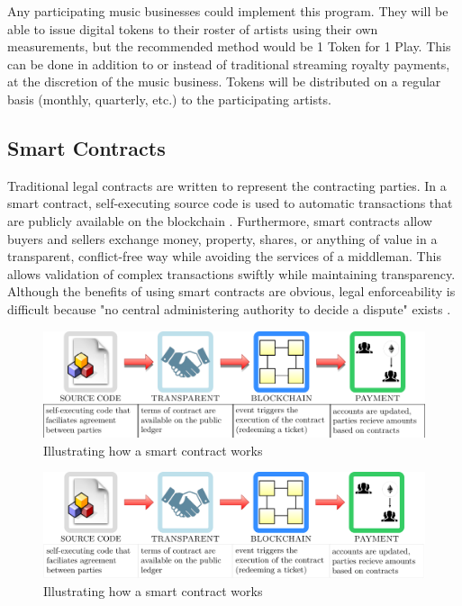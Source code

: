 \documentclass[12pt,tightenlines,letterpaper]{scrartcl}
\begin{document}
Any participating music businesses could implement this program. They will be able to issue digital tokens to their roster of artists using their own measurements, but the recommended method would be 1 Token for 1 Play. This can be done in addition to or instead of traditional streaming royalty payments, at the discretion of the music business. Tokens will be distributed on a regular basis (monthly, quarterly, etc.) to the participating artists.


\subsection{Smart Contracts}
		Traditional legal contracts are written to represent the contracting parties. In a smart contract, self-executing source code is used to automatic transactions that are publicly available on the blockchain \cite{ethereumWhitePaper:Online}.
		Furthermore, \glspl{smart contract} allow buyers and sellers exchange money, property, shares, or anything of value in a transparent, conflict-free way while avoiding the services of a middleman. This allows validation of complex transactions swiftly while maintaining transparency. Although the benefits of using smart contracts are obvious, legal enforceability is difficult because "no central administering authority to decide a dispute" exists \cite{keyfindings:Online}. 


\begin{warpprint}
	\begin{figure}[ht]
		\centering
		\includegraphics[width=1\linewidth]{smartContractsExp.pdf}
		\caption{Illustrating how a smart contract works}
		\label{fig:smartContracts}
	\end{figure}
\end{warpprint}

\begin{warpHTML}
	\begin{figure}[ht]
		\centering
		\includegraphics[width=1\linewidth]{smartContractsExp.svg}
		\caption{Illustrating how a smart contract works}
		\label{fig:smartContracts}
	\end{figure}
\end{warpHTML}
\end{document}
